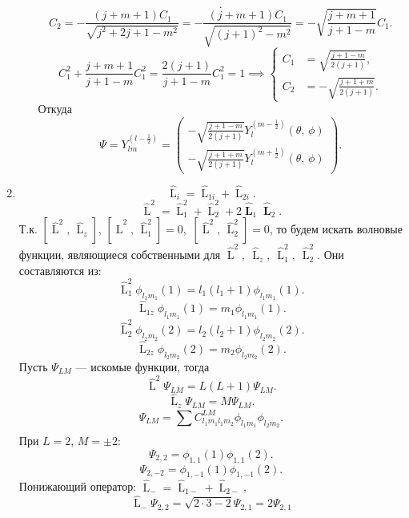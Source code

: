 \documentclass[a4paper]{article}
\begin{document}
\begin{sol}
\begin{enumerate}
\begin{enumerate}
\[.\] 
\[
	C_2= -\frac{(j+m+1)C_1}{\sqrt{j^2+2j+1-m^2} }
	=-\frac{(j+m+1)C_1}{\sqrt{(j+1)^2-m^2} }=
	- \sqrt{\frac{j+m+1}{j+1-m}} C_1
.\] 
\[
	C_1^2+\frac{j+m+1}{j+1-m}C_1^2=\frac{2(j+1)}{j+1-m}C_1^2=1\implies
	\left\{
	\begin{aligned}
		C_1&= \sqrt{\frac{j+1-m}{2(j+1)}} ,\\
		C_2&= - \sqrt{\frac{j+1+m}{2(j+1)}}. 
	\end{aligned}
	\right.
\] 
Откуда
\[
	\Psi=Y_{lm}^{\left( l-\frac{1}{2} \right) }=
	\begin{pmatrix} -\sqrt{\frac{j+1-m}{2(j+1)}} Y_l^{\left( m-\frac{1}{2} \right) }(\theta,\,\phi)\\
	-\sqrt{\frac{j+1+m}{2(j+1)}} Y_l^{\left( m+\frac{1}{2} \right) }(\theta,\,\phi)\end{pmatrix} 
.\] 
\end{enumerate}
\item
	\[
	\widehat{\operatorname{L}}_i= \widehat{\operatorname{L}}_{1i}+ \widehat{\operatorname{L}}_{2i}
	.\] 
	\[
	\widehat{\operatorname{L}}^2=
	\widehat{\operatorname{L}}_1^2+
	\widehat{\operatorname{L}}_2^2+
	2 \widehat{\operatorname{\mathbf{L}}}_1
	\widehat{\operatorname{\mathbf{L}}}_2
	.\] 
Т.\:к. $\left[ \widehat{\operatorname{L}}^2,\,\widehat{\operatorname{L}}_z \right]$,
$
\left[ \widehat{\operatorname{L}}^2,\,\widehat{\operatorname{L}}_1^2 \right] =0
,$ 
$
\left[ \widehat{\operatorname{L}}^2,\,\widehat{\operatorname{L}}_2^2 \right] =0
$,
то будем искать волновые функции, являющиеся
собственными для $\widehat{\operatorname{L}}^2,\ 
 \widehat{\operatorname{L}}_z,\ \widehat{\operatorname{L}}_1^2,\ \widehat{\operatorname{L}}_2^2$. Они составляются
 из:
\[
	\widehat{\operatorname{L}}_1^2 \phi_{l_1 m_1}(1)= l_1 (l_1+1) \phi_{l_1 m_1}(1)
.\] 
\[
	\widehat{\operatorname{L}}_{1z}\phi_{l_1 m_1}(1) = m_1 \phi_{l_1 m_1}(1) 
.\] 
\[
	\widehat{\operatorname{L}}_2^2 \phi_{l_2 m_2}(2)= l_2 (l_2+1) \phi_{l_2 m_2}(2)
.\] 
\[
	\widehat{\operatorname{L}}_{2z}\phi_{l_2 m_2}(2) = m_2 \phi_{l_2 m_2}(2) 
.\] 
Пусть $\Psi_{LM}$ --- искомые функции, тогда
\[
\widehat{\operatorname{L}}^2 \Psi_{LM}=
L(L+1) \Psi_{LM}
.\] 
\[
\widehat{\operatorname{L}}_z \Psi_{LM}=
M \Psi _{LM}
.\] 
\[
\Psi_{LM}= \sum_{}^{} C_{l_1 m_1 l_1 m_2}^{LM}
\phi_{l_1 m_1}\phi_{l_2 m_2}
.\] 
При $L=2$, $M=\pm 2$:
\[
	\Psi_{2,2}= \phi_{1,1}(1)\phi_{1,1}(2)
.\] 
\[
	\Psi_{2,-2}=\phi_{1,-1} (1)\phi_{1,-1}
	(2)
.\] 
Понижающий оператор: $\widehat{\operatorname{L}}_-
= \widehat{\operatorname{L}}_{1-} + \widehat{\operatorname{L}}_{2-}$,
\[
\widehat{\operatorname{L}}_- \Psi_{2,2}=
\sqrt{2\cdot 3-2} \Psi_{2,1}=2 \Psi_{2,1}
\]
\end{enumerate}
\end{sol}
\end{document}
